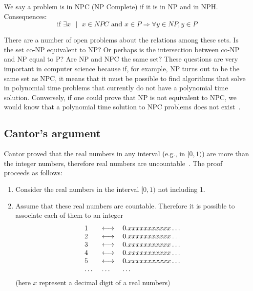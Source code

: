 \documentclass[justified,sixbynine]{tufte-book}
\theoremstyle{plain}%
\theoremstyle{definition}
\theoremstyle{remark}
\begin{document}
\begin{fullwidth}
We say a problem is in NPC (NP Complete) if it is in NP and in NPH.
Consequences:
\begin{equation}
\text{if }\exists x\text{ }|\text{ }x\in NPC\text{ and }x\in P\Rightarrow
\forall y\in NP,y\in P
\end{equation}

There are a number of open problems about the relations among these sets.
Is the set co-NP equivalent to NP? Or perhaps is the intersection between co-NP and NP equal to P?
Are NP and NPC the same set? These questions are very important in computer science because if, for example, NP turns out to be the same set as NPC, it means that it must be possible to find algorithms that solve in polynomial time problems that currently do not have a polynomial time solution. Conversely, if one could prove that NP is not equivalent to NPC, we would know that a polynomial time solution to NPC problems does not exist~\cite{pnp}.

\subsection{Cantor's argument}


Cantor proved that the real numbers in any interval (e.g., in $[0,1)$)
are more than the integer numbers, therefore real numbers are uncountable~\cite{hofstadter}.
The proof proceeds as follows:

\begin{enumerate}
\item  Consider the real numbers in the interval $[0,1)$ not including 1$.$

\item  Assume that these real numbers are countable. Therefore it is
possible to associate each of them to an integer
\begin{equation}
\begin{tabular}{lll}
1 & $\longleftrightarrow $ & $0.xxxxxxxxxxx\dots$ \\
2 & $\longleftrightarrow $ & $0.xxxxxxxxxxx\dots$ \\
3 & $\longleftrightarrow $ & $0.xxxxxxxxxxx\dots$ \\
4 & $\longleftrightarrow $ & $0.xxxxxxxxxxx\dots$ \\
5 & $\longleftrightarrow $ & $0.xxxxxxxxxxx\dots$ \\
\dots & \dots &\dots 
\end{tabular}
\label{cantor}
\end{equation}
(here $x$ represent a decimal digit of a real numbers)


\end{enumerate}
\end{fullwidth}
\end{document}

